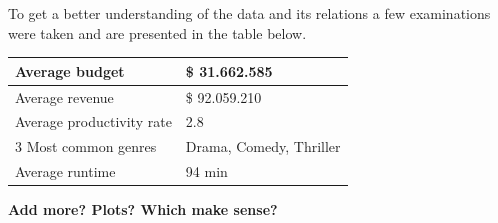 To get a better understanding of the data and its relations a few examinations were taken and are presented in the table below.
\begin{center}
    \begin{tabular}{| l | l |}
    \hline
    Average budget & \$ 31.662.585 \\ \hline
    Average revenue & \$ 92.059.210 \\ \hline
    Average productivity rate & 2.8 \\ \hline
    3 Most common genres & Drama, Comedy, Thriller \\ \hline
    Average runtime & 94 min \\ \hline
    \end{tabular}
\end{center} 

\textbf{Add more? Plots? Which make sense?}
